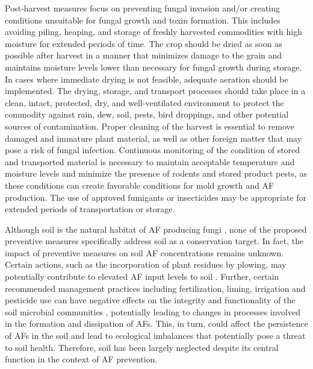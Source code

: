 Post-harvest measures focus on preventing fungal invasion and/or creating conditions unsuitable for fungal growth and toxin formation. This includes avoiding piling, heaping, and storage of freshly harvested commodities with high moisture for extended periods of time. The crop should be dried as soon as possible after harvest in a manner that minimizes damage to the grain and maintains moisture levels lower than necessary for fungal growth during storage. In cases where immediate drying is not feasible, adequate aeration should be implemented. The drying, storage, and transport processes should take place in a clean, intact, protected, dry, and well-ventilated environment to protect the commodity against rain, dew, soil, pests, bird droppings, and other potential sources of contamination. Proper cleaning of the harvest is essential to remove damaged and immature plant material, as well as other foreign matter that may pose a risk of fungal infection. Continuous monitoring of the condition of stored and transported material is necessary to maintain acceptable temperature and moisture levels and minimize the presence of rodents and stored product pests, as these conditions can create favorable conditions for mold growth and AF production. The use of approved fumigants or insecticides may be appropriate for extended periods of transportation or storage.

Although soil is the natural habitat of AF producing fungi \citep{horn2003ecology, elmholt2008mycotoxins}, none of the proposed preventive measures specifically address soil as a conservation target. In fact, the impact of preventive measures on soil AF concentrations remains unknown. Certain actions, such as the incorporation of plant residues by plowing, may potentially contribute to elevated AF input levels to soil \citep{fouche2020aflatoxins}.  Further, certain recommended management practices including fertilization, liming, irrigation and pesticide use can have negative effects on the integrity and functionality of the soil microbial communities \citep{tilman2002agricultural, sanaullah2020terrestrial}, potentially leading to changes in processes involved in the formation and dissipation of AFs. This, in turn, could affect the persistence of AFs in the soil and lead to ecological imbalances that potentially pose a threat to soil health. Therefore, soil has been largely neglected despite its central function in the context of AF prevention.



